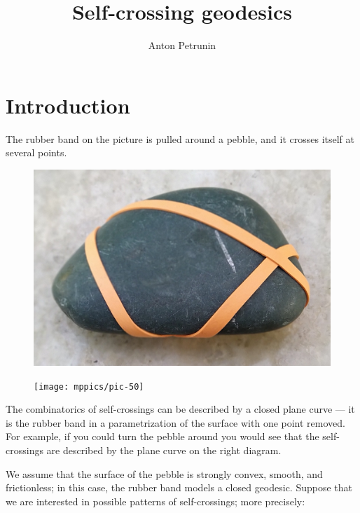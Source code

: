 \documentclass[oneside,a4paper]{amsart}
\begin{document}


\title{Self-crossing geodesics}
\author{Anton Petrunin}
\maketitle

\section{Introduction}


The rubber band on the picture is pulled around a pebble,
and it crosses itself at several points.
\begin{figure}[!ht]
\hfill
\begin{minipage}{.56\textwidth}
\centering
\includegraphics[width=\textwidth]{pics/pebble.jpg}
\end{minipage}
\hfill
\begin{minipage}{.30\textwidth}
\centering
\texttt{[image: mppics/pic-50]}
\end{minipage}
\hfill
\end{figure}
The combinatorics of self-crossings can be described by a closed plane curve --- it is the rubber band in a parametrization of the surface with one point removed.
For example, if you could turn the pebble around you would see that the self-crossings are described by the plane curve on the right diagram.

We assume that the surface of the pebble is strongly convex, smooth, and frictionless;
in this case, the rubber band models a closed geodesic.
Suppose that we are interested in possible patterns of self-crossings; more precisely:
\end{document}

